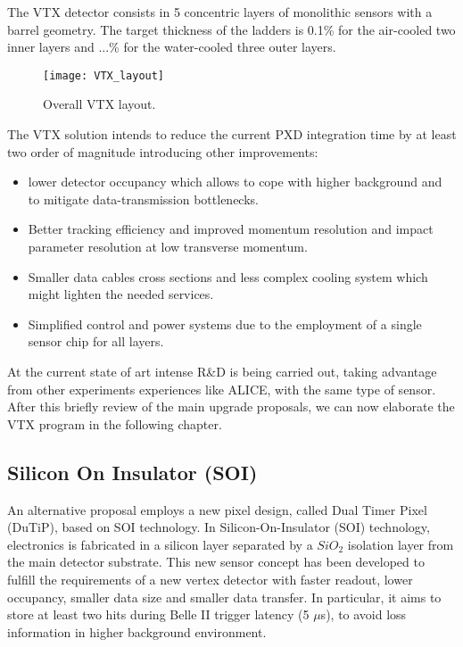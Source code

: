 The VTX detector consists in 5 concentric layers of monolithic sensors with a barrel geometry. The target thickness of the ladders is 0.1\% for the air-cooled two inner layers and ...\% for the water-cooled three outer layers.

\begin{figure}[h!]
\centering
\texttt{[image: VTX\_layout]}
\caption{Overall VTX layout.}
\label{fig:VTX_layout}
\end{figure}

The VTX solution intends to reduce the current PXD integration time by at least two order of magnitude introducing other improvements:

\begin{itemize}
\item lower detector occupancy which allows to cope with higher background and to mitigate data-transmission bottlenecks.
\item Better tracking efficiency and improved momentum resolution and impact parameter resolution at low transverse momentum.
\item Smaller data cables cross sections and less complex cooling system which might lighten the needed services.
\item Simplified control and power systems due to the employment of a single sensor chip for all layers.
\end{itemize}

At the current state of art intense R\&D is being carried out, taking advantage from other experiments experiences like ALICE, with the same type of sensor.\\

After this briefly review of the main upgrade proposals, we can now elaborate the VTX program in the following chapter.

\begin{comment}
Among all these options that we sift through, the last one has been chosen for the future upgrade of the vertex detector. The first two proposals have now been abandoned, the one that contemplates the use of the SOI technology instead, is considered as a backup option. \\
\end{comment}


\subsection{Silicon On Insulator (SOI)}

An alternative proposal employs a new pixel design, called Dual Timer Pixel (DuTiP), based on SOI technology. In Silicon-On-Insulator (SOI) technology, electronics is fabricated in a silicon layer separated by a $SiO_{2}$ isolation layer from the main detector substrate.
This new sensor concept has been developed to fulfill the requirements of a new vertex detector with faster readout, lower occupancy, smaller data size and smaller data transfer. In particular, it aims to store at least two hits during Belle II trigger latency (5 $\mu$s), to avoid loss information in higher background environment. \\

